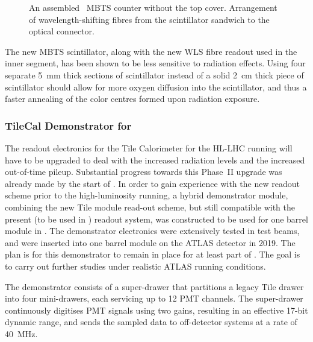 \documentclass[cernpreprint, atlasdraft=false, UKenglish,british,orcidlogo, texmf, orcidlogo]{atlasdoc}
\begin{document}
\begin{figure}[hp]
\centering
{}
\caption{\protect{} An assembled \RunThr\ \gls{MBTS} counter without the top cover. \protect{} Arrangement of wavelength-shifting fibres from the scintillator sandwich to the optical connector.
}
\label{fig:MBTS_Run3}
\end{figure}
 
 
The new \gls{MBTS} scintillator, along with the new \gls{WLS} fibre readout used in the inner segment, has been shown to be less sensitive to radiation effects. Using four separate \SI{5}{\mm} thick sections of scintillator instead of a solid \SI{2}{\cm} thick piece of scintillator should allow for more oxygen diffusion into the scintillator, and thus a faster annealing of the color centres formed upon radiation exposure.
 
\subsubsection{TileCal Demonstrator for \RunFour}
The readout electronics for the Tile Calorimeter for the \gls{HL-LHC} running will have to be upgraded to deal with the increased radiation levels and the increased out-of-time pileup. Substantial progress towards this Phase~II upgrade was already made by the start of \RunThr. In order to gain experience with the new readout scheme prior to the high-luminosity running, a hybrid demonstrator module, combining the new \gls{Tile} module read-out scheme, but still compatible with the present (to be used in \RunThr) readout system, was constructed to be used for one barrel module in \RunThr. The demonstrator electronics were extensively tested in test beams, and were inserted into one barrel module on the ATLAS detector in 2019. The plan is for this demonstrator to remain in place for at least part of \RunThr. The goal is to carry out further studies under realistic ATLAS running conditions.
 
The demonstrator consists of a super-drawer that partitions a legacy \gls{Tile} drawer into four mini-drawers, each servicing up to 12 \gls{PMT} channels. The super-drawer continuously digitises \gls{PMT} signals using two gains, resulting in an effective 17-bit dynamic range, and sends the sampled data to off-detector systems at a rate of \SI{40}{MHz}.
 
\end{document}
